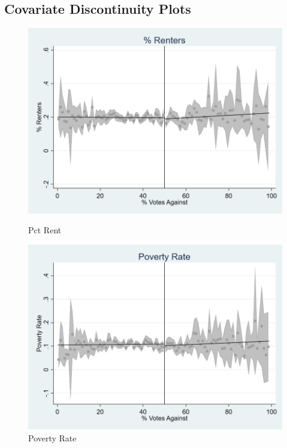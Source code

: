 \subsection{Covariate Discontinuity Plots}


\begin{figure}[ht]
    \centering
    \begin{minipage}[b]{0.40\textwidth}
        \centering
        \includegraphics[width=\textwidth,keepaspectratio]{images/cov_smoothness_pctrent.png}
        \caption*{Pct Rent}
        \label{fig:pctrent_sm}
    \end{minipage}
    \hfill
    \begin{minipage}[b]{0.40\textwidth}
        \centering
        \includegraphics[width=\textwidth,keepaspectratio]{images/cov_smoothness_poverty.png}
        \caption*{Poverty Rate}
        \label{fig:poverty_sm}
    \end{minipage}
    

\end{figure}
